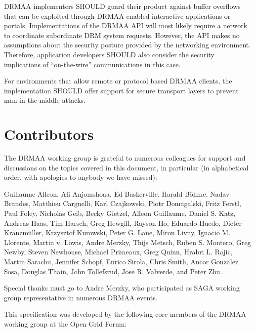\documentclass{article}
\begin{document}
DRMAA implementers SHOULD guard their product against buffer overflows that can be exploited through DRMAA enabled interactive applications or portals. Implementations of the DRMAA API will most likely require a network to coordinate subordinate DRM system requests. However, the API makes no assumptions about the security posture provided by the networking environment. Therefore, application developers SHOULD also consider the security implications of \enquote{on-the-wire} communications in this case.

For environments that allow remote or protocol based DRMAA clients, the implementation SHOULD offer support for secure transport layers to prevent man in the middle attacks.

\section{Contributors}


The DRMAA working group is grateful to numerous colleagues for support and discussions on the topics covered in this document, in particular (in alphabetical order, with apologies to anybody we have missed): 

Guillaume Alleon, 
Ali Anjomshoaa, 
Ed Baskerville, 
Harald Böhme, 
Nadav Brandes,
Matthieu Cargnelli, 
Karl Czajkowski, 
Piotr Domagalski, 
Fritz Ferstl, 
Paul Foley, 
Nicholas Geib, 
Becky Gietzel, 
Alleon Guillaume, 
Daniel S. Katz,
Andreas Haas,
Tim Harsch, 
Greg Hewgill, 
Rayson Ho, 
Eduardo Huedo, 
Dieter Kranzmüller, 
Krzysztof Kurowski, 
Peter G. Lane, 
Miron Livny, 
Ignacio M. Llorente, 
Martin v. Löwis, 
Andre Merzky, 
Thijs Metsch,
Ruben S. Montero, 
Greg Newby, 
Steven Newhouse, 
Michael Primeaux, 
Greg Quinn, 
Hrabri L. Rajic,
Martin Sarachu, 
Jennifer Schopf, 
Enrico Sirola, 
Chris Smith, 
Ancor Gonzalez Sosa, 
Douglas Thain, 
John Tollefsrud, 
Jose R. Valverde, 
and Peter Zhu.

Special thanks must go to Andre Merzky, who participated as SAGA working group representative in numerous DRMAA events. 

This specification was developed by the following core members of the DRMAA working group at the Open Grid Forum:
\end{document}
